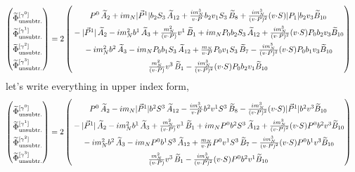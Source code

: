 \documentclass[]{article}
\numberwithin{equation}{section}
\newcommand{\tcdot}{{\cdot}}
\newcommand{\tAmp}{\widetilde{A}}
\newcommand{\tBmp}{\widetilde{B}}
\newcommand{\bvec}{b}
\newcommand{\mN}{m_N}
\newcommand{\unsub}{\text{unsubtr.}}
\begin{document}
\begin{align}
    \begin{pmatrix}
        \rule{0pt}{16pt} \widetilde \Phi^{[\gamma^{0}]}_{\unsub}\\
        \rule{0pt}{16pt} \widetilde \Phi^{[\gamma^{1}]}_{\unsub}\\
        \rule{0pt}{16pt} \widetilde \Phi^{[\gamma^{2}]}_{\unsub}\\
        \rule{0pt}{16pt} \widetilde \Phi^{[\gamma^{3}]}_{\unsub}
    \end{pmatrix} &=2\begin{pmatrix}
       \rule{0pt}{16pt}  P^0\, \tAmp_2  + i \mN  |\vec{P}^1| \bvec_2 S_3\, \tAmp_{12}+ \frac{ i \mN^3}{v \tcdot P}  \bvec_2 v_1 S_3\, \tBmp_8+ \frac{i \mN^3}{(v \tcdot P)^2} (v \tcdot S)  |P_1| \bvec_2 v_3 \tBmp_{10}\\
        \rule{0pt}{16pt} -|\vec{P}^1|\, \tAmp_2- i \mN^2 \bvec^1\, \tAmp_3+ \frac{\mN^2}{(v \tcdot P)} v^1\, \tBmp_1 
		+ i \mN  P_0 \bvec_2 S_3\, \tAmp_{12}+ \frac{i \mN^3}{(v \tcdot P)^2} (v \tcdot S)  P_0 \bvec_2 v_3 \tBmp_{10}\\
         \rule{0pt}{16pt} - i \mN^2 \bvec^2\, \tAmp_3
		- i \mN  P_0 \bvec_1 S_3\, \tAmp_{12}+ \frac{\mN}{v \tcdot P}  P_0 v_1 S_3\, \tBmp_7- \frac{i \mN^3}{(v \tcdot P)^2} (v \tcdot S) P_0 \bvec_1 v_3 \tBmp_{10}\\
        \rule{0pt}{16pt} \frac{\mN^2}{(v \tcdot P)} v^3\, \tBmp_1- \frac{i \mN^3}{(v \tcdot P)^2} (v \tcdot S)  P_0 \bvec_2 v_1 \tBmp_{10}
    \end{pmatrix}
\end{align}
let's write everything in upper index form,
\begin{align}
    \begin{pmatrix}
        \rule{0pt}{16pt} \widetilde \Phi^{[\gamma^{0}]}_{\unsub}\\
        \rule{0pt}{16pt} \widetilde \Phi^{[\gamma^{1}]}_{\unsub}\\
        \rule{0pt}{16pt} \widetilde \Phi^{[\gamma^{2}]}_{\unsub}\\
        \rule{0pt}{16pt} \widetilde \Phi^{[\gamma^{3}]}_{\unsub}
    \end{pmatrix} &=2\begin{pmatrix}
       \rule{0pt}{16pt}  P^0\, \tAmp_2  - i \mN  |\vec{P}^1| \bvec^2 S^3\, \tAmp_{12}- \frac{ i \mN^3}{v \tcdot P}  \bvec^2 v^1 S^3\, \tBmp_8- \frac{i \mN^3}{(v \tcdot P)^2} (v \tcdot S)  |\vec{P}^1| \bvec^2 v^3 \tBmp_{10}\\
        \rule{0pt}{16pt} -|\vec{P}^1|\, \tAmp_2- i \mN^2 \bvec^1\, \tAmp_3+ \frac{\mN^2}{(v \tcdot P)} v^1\, \tBmp_1 
		+ i \mN  P^0 \bvec^2 S^3\, \tAmp_{12}+ \frac{i \mN^3}{(v \tcdot P)^2} (v \tcdot S)  P^0 \bvec^2 v^3 \tBmp_{10}\\
         \rule{0pt}{16pt} - i \mN^2 \bvec^2\, \tAmp_3
		- i \mN  P^0 \bvec^1 S^3\, \tAmp_{12}+ \frac{\mN}{v \tcdot P}  P^0 v^1 S^3\, \tBmp_7- \frac{i \mN^3}{(v \tcdot P)^2} (v \tcdot S) P^0 \bvec^1 v^3 \tBmp_{10}\\
        \rule{0pt}{16pt} \frac{\mN^2}{(v \tcdot P)} v^3\, \tBmp_1- \frac{i \mN^3}{(v \tcdot P)^2} (v \tcdot S)  P^0 \bvec^2 v^1 \tBmp_{10}
    \end{pmatrix}
\end{align}
\end{document}

